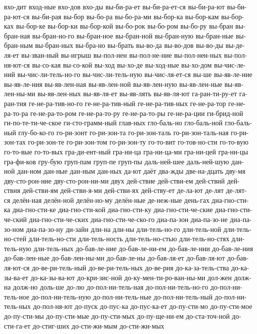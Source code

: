 {вхо-дит
вход-ные
вхо-дов
вхо-ды
вы-би-ра-ет
вы-би-ра-ет-ся
вы-би-ра-ют
вы-би-ра-ют-ся
вы-би-рая
вы-бор
вы-бо-ра
вы-бо-ра-ми
вы-бор-ка
вы-бор-кам
вы-бор-ках
вы-бор-ке
вы-бор-ки
вы-бор-кой
вы-бо-рок
вы-бо-ром
вы-бо-ру
вы-бран
вы-бран-ная
вы-бран-но-го
вы-бран-ное
вы-бран-ной
вы-бран-ную
вы-бран-ные
вы-бран-ным
вы-бран-ных
вы-бра-но
вы-брать
вы-во-да
вы-во-дов
вы-во-ды
вы-де-ля-ет
вы-зван-ный
вы-игрыш
вы-пол-нен
вы-пол-не-ние
вы-пол-нен-ных
вы-пол-ня-ют-ся
вы-со-кая
вы-со-кой
вы-ход
вы-хо-де
вы-ход-ные
вы-хо-дом
вы-чис-ле-ний
вы-чис-ли-тель-но-го
вы-чис-ли-тель-ную
вы-чис-ля-ет-ся
вы-ше
вы-яв-ле-ние
вы-яв-ле-ния
вы-яв-лен-ная
вы-яв-лен-ной
вы-яв-лен-ную
вы-яв-лен-ные
вы-яв-лен-ны-ми
вы-яв-лен-ных
вы-яв-ля-ет
вы-яв-лять
вы-яв-ля-ют
га-ран-ти-ру-ет
га-ран-тия
ге-не-ра-тив-но-го
ге-не-ра-тив-ный
ге-не-ра-тив-ных
ге-не-ра-тор
ге-не-ра-то-ра
ге-не-ра-то-ром
ге-не-ра-то-ру
ге-не-ра-то-ры
ге-не-ра-ции
ги-брид-ной
ги-по-те-ти-че-ское
ги-сто-грамм-ный
глав-ных
гло-баль-но
гло-баль-ной
гло-баль-ный
глу-бо-ко-го
го-ри-зонт
го-ри-зон-та
го-ри-зон-таль
го-ри-зон-таль-ная
го-ри-зон-тах
го-ри-зон-те
го-ри-зон-том
го-ри-зон-ту
го-то-вит
го-тов-но-сти
го-то-вую
го-то-вые
го-то-вых
гра-ди-ент-ный
гра-ни-ца
гра-ни-ца-ми
гра-ни-цей
гра-ни-цы
гра-фи-ков
гру-бую
груп-пам
груп-пе
груп-пы
даль-ней-шее
даль-ней-шую
дан-ной
дан-ном
дан-ные
дан-ным
дан-ных
да-ют
даёт
два-жды
две-на-дцать
дву-мя
дву-сто-рон-ние
дву-сто-рон-ни-ми
двух
дей-ствие
дей-стви-ем
дей-ствий
дей-ствия
дей-стви-ям
дей-стви-я-ми
дей-стви-ях
дей-ству-ет
де-ла-ют
де-лят
де-лят-ся
делён-ная
делён-ной
делён-но-му
делён-ные
де-неж-ные
день-гах
диа-гно-сти-ка
диа-гно-сти-ке
диа-гно-сти-кой
диа-гно-сти-ку
диа-гно-сти-че-ские
диа-гно-сти-че-ский
диа-гно-сти-че-ских
диа-гно-сти-че-ско-го
диа-па-зон
диа-па-зо-не
диа-па-зо-ном
диа-па-зо-ну
ди-зайн
дли-на
дли-ны
дли-тель-но-го
дли-тель-ной
дли-тель-но-стей
дли-тель-но-сти
дли-тель-ность
дли-тель-но-стью
дли-тель-но-стях
дли-тель-ную
дли-тель-ных
до-бав-ле-ние
до-бав-ле-ни-ем
до-бав-ле-нии
до-бав-ле-ния
до-бав-лен-ные
до-бав-лен-ны-ми
до-бав-ле-ны
до-бав-ля-ет
до-бав-ля-ют
до-бав-ля-ют-ся
до-ве-ри-тель-ный
до-ве-ри-тель-ных
до-ве-рия
до-ка-за-тель-ства
до-ка-зы-ва-ет
до-ка-зы-ва-ют
до-кри-зис-ной
до-ку-мен-ти-ро-ван-ны-ми
дол-жен
долж-на
долж-но
доль-ше
до-лю
до-пол-ни-тель-ная
до-пол-ни-тель-но-го
до-пол-ни-тель-ное
до-пол-ни-тель-ную
до-пол-ни-тель-ные
до-пол-ни-тель-ный
до-пол-ни-тель-ных
до-пол-ня-ют
до-пуск
до-пус-ка
до-пус-ка-ет
до-пу-сти-мо
до-пу-сти-мое
до-пу-сти-мы
до-пу-сти-мые
до-пу-сти-мых
до-пу-ще-ни-ем
до-ста-точ-ной
до-сти-га-ет
до-стиг-ших
до-сти-жи-мым
до-сти-жи-мых
}
